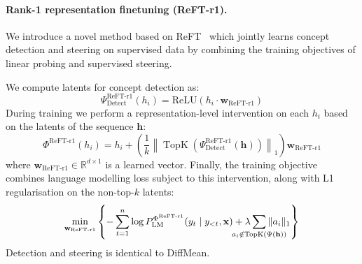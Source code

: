 \documentclass{article}
\theoremstyle{plain}
\theoremstyle{definition}
\theoremstyle{remark}
\renewcommand{\cite}{\citep}
\DeclareMathOperator*{\topk}{TopK}
\newcommand{\methodtag}[2]{%
  \tikz[baseline=(char.base)]{%
    \node[
      fill=#1,
      rounded corners=2pt,
      text=white,
      font=\bfseries,
      minimum width=1em,
      minimum height=1em,
      align=center,
      inner sep=0pt
    ](char){#2};%
  }%
}
\newcommand{\concepttag}{\protect\methodtag{conceptcolor}{C}}
\newcommand{\steeringtag}{\protect\methodtag{steeringcolor}{S}}
\begin{document}
\paragraph{\concepttag{}\steeringtag{} Rank-1 representation finetuning (ReFT-r1).} We introduce a novel method based on ReFT~\cite{wu2024reft} which jointly learns concept detection and steering on supervised data by combining the training objectives of linear probing and supervised steering.

We compute latents for concept detection as:
\begin{equation}
\Psi_{\text{Detect}}^{\text{ReFT-r1}}(h_i) = \mathrm{ReLU}(h_i \cdot \mathbf{w}_{\text{ReFT-r1}})
\end{equation}
During training we perform a representation-level intervention on each $h_i$ based on the latents of the sequence $\mathbf{h}$:
\begin{equation}
\Phi^{\text{ReFT-r1}}(h_i) = h_i + \left(\frac{1}{k}{\left\lVert \topk(\Psi_{\text{Detect}}^{\text{ReFT-r1}}(\mathbf{h})) \right\rVert_1}\right) \mathbf{w}_{\text{ReFT-r1}}
\end{equation}
where \(\mathbf{w}_{\text{ReFT-r1}} \in \mathbb{R}^{d \times 1}\) is a learned vector. Finally, the training objective combines language modelling loss subject to this intervention, along with L1 regularisation on the non-top-$k$ latents:
\begin{equation}
\min_{\mathbf{w}_{\text{ReFT-r1}}}\left\{
-\sum_{t=1}^n{\log P_{\mathrm{LM}}^{\Phi^{\text{ReFT-r1}}}(y_t \mid y_{<t}, \mathbf{x})}
+ \lambda\sum_{\mathclap{a_i \notin \topk\left(\Psi(\mathbf{h})\right)}}{\lVert a_i \rVert_1}
\right\}
\end{equation}
Detection and steering is identical to DiffMean.
\end{document}
